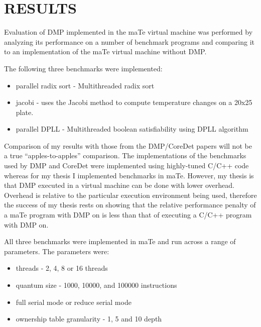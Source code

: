 \chapter{RESULTS}
\label{RESULTS}

Evaluation of DMP implemented in the maTe virtual machine was
performed by analyzing its performance on a number of benchmark
programs and comparing it to an implementation of the maTe virtual
machine without DMP.

The following three benchmarks were implemented:

\begin{itemize}
\item parallel radix sort - Multithreaded radix sort

\item jacobi - uses the Jacobi method to compute temperature changes
  on a 20x25 plate.

\item parallel DPLL - Multithreaded boolean satisfiability using DPLL
  algorithm
\end{itemize}

Comparison of my results with those from the DMP/CoreDet papers will
not be a true ``apples-to-apples'' comparison.  The implementations of
the benchmarks used by DMP \cite{dmp} and CoreDet \cite{coredet} were
implemented using highly-tuned C/C++ code whereas for my thesis I
implemented benchmarks in maTe.  However, my thesis is that DMP
executed in a virtual machine can be done with lower overhead.
Overhead is relative to the particular execution environment being
used, therefore the success of my thesis rests on showing that the
relative performance penalty of a maTe program with DMP on is less
than that of executing a C/C++ program with DMP on.

All three benchmarks were implemented in maTe and run across a range
of parameters.  The parameters were:

\begin{itemize}
\item threads - 2, 4, 8 or 16 threads

\item quantum size - 1000, 10000, and 100000 instructions

\item full serial mode or reduce serial mode

\item ownership table granularity - 1, 5 and 10 depth
\end{itemize}

